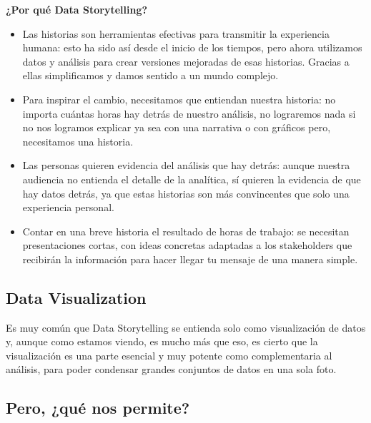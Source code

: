 \documentclass[preprint,12pt]{elsarticle}
\begin{document}
	\textbf{¿Por qué Data Storytelling?}

	\begin{itemize}
		\item Las historias son herramientas efectivas para transmitir la experiencia humana: esto ha sido así desde el inicio de los tiempos, pero ahora utilizamos datos y análisis para crear versiones mejoradas de esas historias. Gracias a ellas simplificamos y damos sentido a un mundo complejo.
		\item Para inspirar el cambio, necesitamos que entiendan nuestra historia: no importa cuántas horas hay detrás de nuestro análisis, no lograremos nada si no nos logramos explicar ya sea con una narrativa o con gráficos pero, necesitamos una historia.

		\item Las personas quieren evidencia del análisis que hay detrás: aunque nuestra audiencia no entienda el detalle de la analítica, sí quieren la evidencia de que hay datos detrás, ya que estas historias son más convincentes que solo una experiencia personal.

		\item Contar en una breve historia el resultado de horas de trabajo: se necesitan presentaciones cortas, con ideas concretas adaptadas a los stakeholders que recibirán la información para hacer llegar tu mensaje de una manera simple. 	
	\end{itemize}

	\subsection{Data Visualization}
	Es muy común que Data Storytelling se entienda solo como visualización de datos y, aunque como estamos viendo, es mucho más que eso, es cierto que la visualización es una parte esencial y muy potente como complementaria al análisis, para poder condensar grandes conjuntos de datos en una sola foto.\\

\subsection{Pero, ¿qué nos permite?}
	
\end{document}
